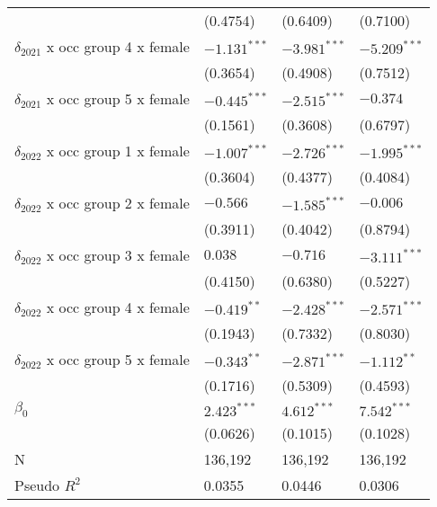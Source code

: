 \begin{tabular}{llll}
                                       &           (0.4754) &           (0.6409) &           (0.7100) \\
$\delta_{2021}$ x occ group 4 x female &     $-1.131^{***}$ &     $-3.981^{***}$ &     $-5.209^{***}$ \\
                                       &           (0.3654) &           (0.4908) &           (0.7512) \\
$\delta_{2021}$ x occ group 5 x female &     $-0.445^{***}$ &     $-2.515^{***}$ &           $-0.374$ \\
                                       &           (0.1561) &           (0.3608) &           (0.6797) \\
$\delta_{2022}$ x occ group 1 x female &     $-1.007^{***}$ &     $-2.726^{***}$ &     $-1.995^{***}$ \\
                                       &           (0.3604) &           (0.4377) &           (0.4084) \\
$\delta_{2022}$ x occ group 2 x female &           $-0.566$ &     $-1.585^{***}$ &           $-0.006$ \\
                                       &           (0.3911) &           (0.4042) &           (0.8794) \\
$\delta_{2022}$ x occ group 3 x female &            $0.038$ &           $-0.716$ &     $-3.111^{***}$ \\
                                       &           (0.4150) &           (0.6380) &           (0.5227) \\
$\delta_{2022}$ x occ group 4 x female &      $-0.419^{**}$ &     $-2.428^{***}$ &     $-2.571^{***}$ \\
                                       &           (0.1943) &           (0.7332) &           (0.8030) \\
$\delta_{2022}$ x occ group 5 x female &      $-0.343^{**}$ &     $-2.871^{***}$ &      $-1.112^{**}$ \\
                                       &           (0.1716) &           (0.5309) &           (0.4593) \\
$\beta_0$                              &      $2.423^{***}$ &      $4.612^{***}$ &      $7.542^{***}$ \\
                                       &           (0.0626) &           (0.1015) &           (0.1028) \\
N                                      &            136,192 &            136,192 &            136,192 \\
Pseudo $R^2$                           &             0.0355 &             0.0446 &             0.0306 \\
\bottomrule
\end{tabular}
